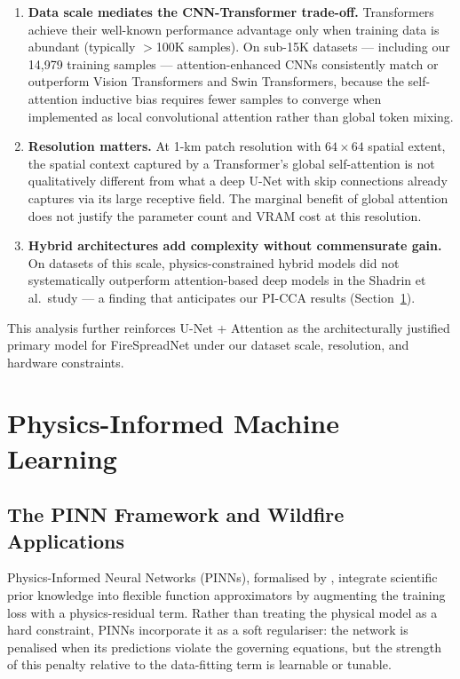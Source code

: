 \begin{enumerate}
    \item \textbf{Data scale mediates the CNN-Transformer trade-off.}
          Transformers achieve their well-known performance advantage only when training data is abundant (typically $>$100K samples).
          On sub-15K datasets — including our 14,979 training samples — attention-enhanced CNNs consistently match or outperform Vision Transformers and Swin Transformers, because the self-attention inductive bias requires fewer samples to converge when implemented as local convolutional attention rather than global token mixing.

    \item \textbf{Resolution matters.}
          At 1-km patch resolution with $64\times64$ spatial extent, the spatial context captured by a Transformer's global self-attention is not qualitatively different from what a deep U-Net with skip connections already captures via its large receptive field.
          The marginal benefit of global attention does not justify the parameter count and VRAM cost at this resolution.

    \item \textbf{Hybrid architectures add complexity without commensurate gain.}
          On datasets of this scale, physics-constrained hybrid models did not systematically outperform attention-based deep models in the Shadrin et al.\ study — a finding that anticipates our PI-CCA results (Section~\ref{sec:sota_piml}).
\end{enumerate}

This analysis further reinforces U-Net + Attention as the architecturally justified primary model for FireSpreadNet under our dataset scale, resolution, and hardware constraints.

\section{Physics-Informed Machine Learning}
\label{sec:sota_piml}

\subsection{The PINN Framework and Wildfire Applications}

Physics-Informed Neural Networks (PINNs), formalised by \citet{raissi2019physics}, integrate scientific prior knowledge into flexible function approximators by augmenting the training loss with a physics-residual term.
Rather than treating the physical model as a hard constraint, PINNs incorporate it as a soft regulariser: the network is penalised when its predictions violate the governing equations, but the strength of this penalty relative to the data-fitting term is learnable or tunable.

